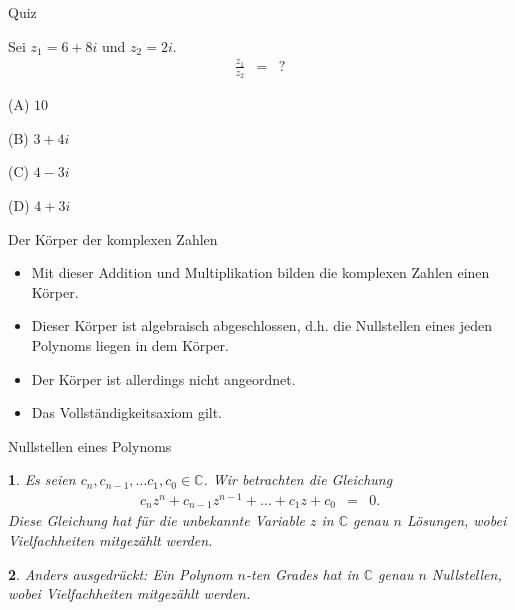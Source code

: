 \documentclass[german]{beamer}
\newcommand{\bq}{\begin{eqnarray*}}
\newcommand{\eq}{\end{eqnarray*}}
\newtheorem*{myemptytheorem}{}
\begin{document}
\begin{frame}{Quiz}

Sei $z_1=6+8i$ und $z_2=2i$.
\bq
 \frac{z_1}{z_2} & = & ?
\eq 
\begin{description}
\item{(A)} $10$
\item{(B)} $3+4i$
\item{(C)} $4-3i$
\item{(D)} $4+3i$
\end{description}

\end{frame}

\begin{frame}{Der K\"orper der komplexen Zahlen}

\begin{itemize}
\item Mit dieser Addition und Multiplikation bilden die komplexen Zahlen einen K\"orper.
\item Dieser K\"orper ist algebraisch abgeschlossen, d.h. die Nullstellen eines jeden Polynoms liegen in dem K\"orper.
\item Der K\"orper ist allerdings nicht angeordnet.
\item Das Vollst\"andigkeitsaxiom gilt.
\end{itemize}

\end{frame}

\begin{frame}{Nullstellen eines Polynoms}

\begin{myemptytheorem}
Es seien $c_n, c_{n-1}, \dots c_1, c_0 \in \mathbb{C}$.
Wir betrachten die Gleichung
\bq
 c_n z^n + c_{n-1} z^{n-1} + \dots + c_1 z + c_0 & = & 0.
\eq
Diese Gleichung hat f\"ur die unbekannte Variable $z$ in $\mathbb{C}$ genau $n$ L\"osungen, wobei Vielfachheiten mitgez\"ahlt werden.
\end{myemptytheorem}

\vspace*{5mm}
\begin{myemptytheorem}
Anders ausgedr\"uckt: Ein Polynom $n$-ten Grades hat in $\mathbb{C}$ genau $n$ Nullstellen, wobei Vielfachheiten mitgez\"ahlt werden.
\end{myemptytheorem}

\end{frame}
\end{document}

